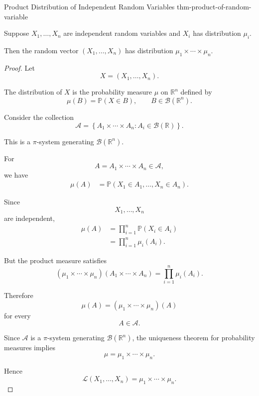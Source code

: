 \begin{theorem}{Product Distribution of Independent Random Variables}
{thm-product-of-random-variable}

Suppose $X_1,\ldots,X_n$ are independent random variables and
$X_i$ has distribution $\mu_i$.

Then the random vector
\(
(X_1,\ldots,X_n)
\)
has distribution
\(
\mu_1\times\cdots\times\mu_n.
\)

\end{theorem}

\begin{proof}

Let
\[
X=(X_1,\ldots,X_n).
\]

The distribution of $X$ is the probability measure
$\mu$ on $\mathbb{R}^n$ defined by
\[
\mu(B)
=
\mathbb{P}(X\in B),
\qquad
B\in\mathcal{B}(\mathbb{R}^n).
\]

Consider the collection
\[
\mathcal{A}
=
\left\{
A_1\times\cdots\times A_n:
A_i\in\mathcal{B}(\mathbb{R})
\right\}.
\]

This is a $\pi$-system generating
$\mathcal{B}(\mathbb{R}^n)$.

For
\[
A=A_1\times\cdots\times A_n\in\mathcal{A},
\]
we have
\[
\begin{aligned}
\mu(A)
&=
\mathbb{P}
\left(
X_1\in A_1,\ldots,X_n\in A_n
\right).
\end{aligned}
\]

Since
\[
X_1,\ldots,X_n
\]
are independent,
\[
\begin{aligned}
\mu(A)
&=
\prod_{i=1}^{n}
\mathbb{P}(X_i\in A_i)\\
&=
\prod_{i=1}^{n}\mu_i(A_i).
\end{aligned}
\]

But the product measure satisfies
\[
(\mu_1\times\cdots\times\mu_n)
(A_1\times\cdots\times A_n)
=
\prod_{i=1}^{n}\mu_i(A_i).
\]

Therefore
\[
\mu(A)
=
(\mu_1\times\cdots\times\mu_n)(A)
\]
for every
\[
A\in\mathcal{A}.
\]

Since $\mathcal{A}$ is a $\pi$-system generating
$\mathcal{B}(\mathbb{R}^n)$, the uniqueness theorem for probability
measures implies
\[
\mu
=
\mu_1\times\cdots\times\mu_n.
\]

Hence
\[
\boxed{
\mathcal{L}(X_1,\ldots,X_n)
=
\mu_1\times\cdots\times\mu_n.
}
\]

\end{proof}



